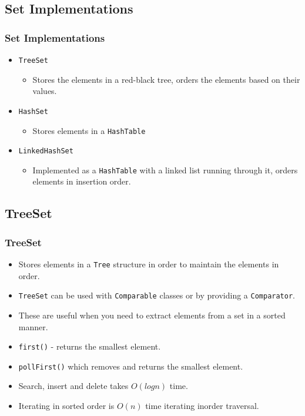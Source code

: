 \documentclass{beamer}
\begin{document}
\subsection{Set Implementations}
\begin{frame}
\frametitle{Set Implementations}
\begin{itemize}
\item \texttt{\color{red}TreeSet}
\begin{itemize}
\item Stores the elements in a red-black tree, orders the elements based on their values.
\end{itemize}
\item \texttt{\color{green}HashSet}
\begin{itemize}
\item Stores elements in a \texttt{HashTable}
\end{itemize}
\item \texttt{\color{orange}LinkedHashSet}
\begin{itemize}
\item Implemented as a \texttt{HashTable} with a linked list running through it, orders elements in insertion order.
\end{itemize}
\end{itemize}
\end{frame}
\subsection{TreeSet}
\begin{frame}
\frametitle{TreeSet}
\begin{itemize}
\item Stores elements in a \texttt{Tree} structure in order to maintain the elements in order.
\item \texttt{TreeSet} can be used with \texttt{Comparable} classes or by providing a \texttt{Comparator}.
\item These are useful when you need to extract elements from a set in a sorted manner.
\item \texttt{first()} - returns the smallest element.
\item \texttt{pollFirst()} which removes and returns the smallest element.
\item Search, insert and delete takes $O(logn)$ time.
\item Iterating in sorted order is $O(n)$ time iterating inorder traversal.
\end{itemize}
\end{frame}
\end{document}
